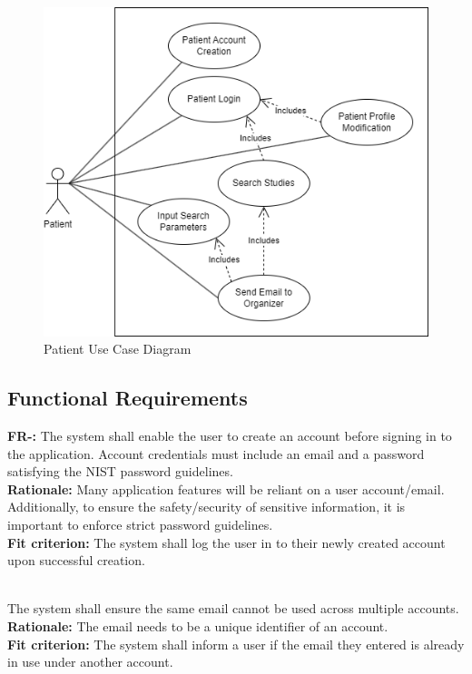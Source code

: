 \documentclass[12pt, titlepage]{article}
\newcounter{FR_Counter}
\begin{document}
\begin{enumerate}
\begin{figure}[H]
\centering
\includegraphics[scale=0.5]{PatientUseCase.png}
\caption{Patient Use Case Diagram}
\end{figure}

\end{enumerate}

\subsection{Functional Requirements}

\textbf{FR-\the\value{FR_Counter}:}
The system shall enable the user to create an account before signing in to the application. Account credentials must include 
an email and a password satisfying the NIST password guidelines.\\
\textbf{Rationale:}
Many application features will be reliant on a user account/email. Additionally, to ensure the safety/security of sensitive information,
it is important to enforce strict password guidelines. \\
\textbf{Fit criterion:}
The system shall log the user in to their newly created account upon successful creation. \\~\\
\addtocounter{FR_Counter}{1}

The system shall ensure the same email cannot be used across multiple accounts.\\
\textbf{Rationale:}
The email needs to be a unique identifier of an account.\\
\textbf{Fit criterion:}
The system shall inform a user if the email they entered is already in use under another account. \\~\\
\addtocounter{FR_Counter}{1}
\end{document}
